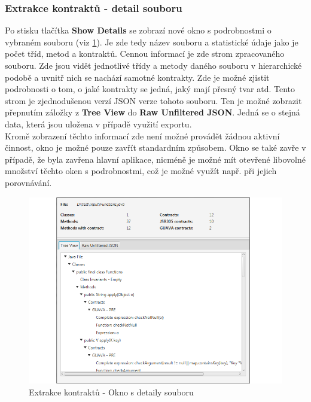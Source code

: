 			\subsubsection{Extrakce kontraktů - detail souboru}
				Po stisku tlačítka \textbf{Show Details} se zobrazí nové okno s podrobnostmi o vybraném souboru (viz \ref{guide05}). Je zde tedy název souboru a statistické údaje jako je počet tříd, metod a kontraktů. Cennou informací je zde strom zpracovaného souboru. Zde jsou vidět jednotlivé třídy a metody daného souboru v hierarchické podobě a uvnitř nich se nachází samotné kontrakty. Zde je možné zjistit podrobnosti o tom, o jaké kontrakty se jedná, jaký mají přesný tvar atd. Tento strom je zjednodušenou verzí JSON verze tohoto souboru. Ten je možné zobrazit přepnutím záložky z \textbf{Tree View} do \textbf{Raw Unfiltered JSON}. Jedná se o stejná data, která jsou uložena v případě využití exportu.\\
				
				Kromě zobrazení těchto informací zde není možné provádět žádnou aktivní činnost, okno je možné pouze zavřít standardním způsobem. Okno se také zavře v případě, že byla zavřena hlavní aplikace, nicméně je možné mít otevřené libovolné množství těchto oken s podrobnostmi, což je možné využít např. při jejich porovnávání.
				
			\begin{figure}[!htb]
					\centering
					\includegraphics[width=1\textwidth]{img/guide05.png}
					\caption[guide05]{Extrakce kontraktů - Okno s detaily souboru}
					\label{guide05}
				\endminipage\hfill
			\end{figure}
			
